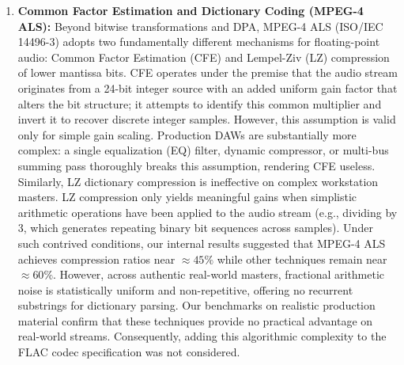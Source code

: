 \documentclass[10pt,twocolumn]{article}
\begin{document}
\begin{enumerate}
	\item \textbf{Common Factor Estimation and Dictionary Coding (MPEG-4 ALS):} Beyond bitwise transformations and DPA, MPEG-4 ALS (ISO/IEC 14496-3) \cite{mp4} adopts two fundamentally different mechanisms for floating-point audio: Common Factor Estimation (CFE) and Lempel-Ziv (LZ) compression of lower mantissa bits. CFE operates under the premise that the audio stream originates from a 24-bit integer source with an added uniform gain factor that alters the bit structure; it attempts to identify this common multiplier and invert it to recover discrete integer samples. However, this assumption is valid only for simple gain scaling. Production DAWs are substantially more complex: a single equalization (EQ) filter, dynamic compressor, or multi-bus summing pass thoroughly breaks this assumption, rendering CFE useless. Similarly, LZ dictionary compression is ineffective on complex workstation masters. LZ compression only yields meaningful gains when simplistic arithmetic operations have been applied to the audio stream (e.g., dividing by 3, which generates repeating binary bit sequences across samples). Under such contrived conditions, our internal results suggested that MPEG-4 ALS achieves compression ratios near $\approx 45\%$ while other techniques remain near $\approx 60\%$. However, across authentic real-world masters, fractional arithmetic noise is statistically uniform and non-repetitive, offering no recurrent substrings for dictionary parsing. Our benchmarks on realistic production material confirm that these techniques provide no practical advantage on real-world streams. Consequently, adding this algorithmic complexity to the FLAC codec specification was not considered.
\end{enumerate}
\end{document}

